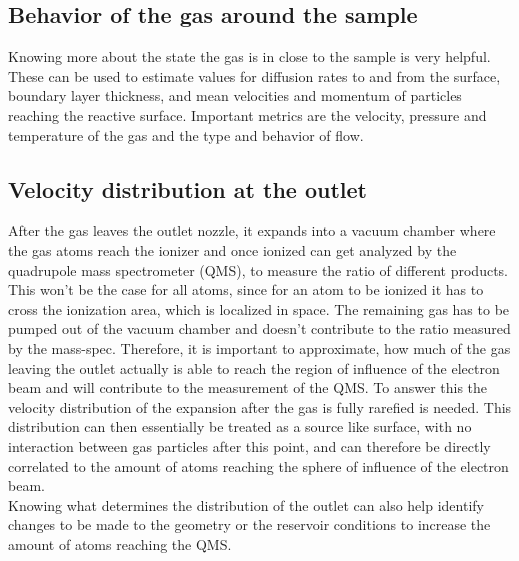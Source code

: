 \subsection{Behavior of the gas around the sample}

	Knowing more about the state the gas is in close to the sample is very helpful.
	These can be used to estimate values for diffusion rates to and from the surface, boundary layer thickness, and mean velocities and momentum of particles reaching the reactive surface. 
	Important metrics are the velocity, pressure and temperature of the gas and the type and behavior of flow.

\subsection{Velocity distribution at the outlet}

	After the gas leaves the outlet nozzle, it expands into a vacuum chamber where the gas atoms reach the ionizer and once ionized can get analyzed by the quadrupole mass spectrometer (QMS), to measure the ratio of different products.
	This won't be the case for all atoms, since for an atom to be ionized it has to cross the ionization area, which is localized in space.
	The remaining gas has to be pumped out of the vacuum chamber and doesn't contribute to the ratio measured by the mass-spec.
	Therefore, it is important to approximate, how much of the gas leaving the outlet actually is able to reach the region of influence of the electron beam and will contribute to the measurement of the QMS.
	To answer this the velocity distribution of the expansion after the gas is fully rarefied is needed.
	This distribution can then essentially be treated as a source like surface, with no interaction between gas particles after this point, and can therefore be directly correlated to the amount of atoms reaching the sphere of influence of the electron beam.\\
	Knowing what determines the distribution of the outlet can also help identify changes to be made to the geometry or the reservoir conditions to increase the amount of atoms reaching the QMS.
